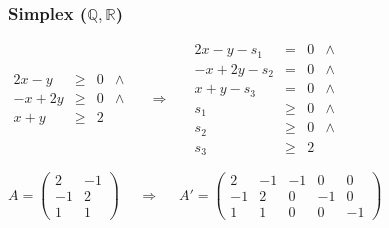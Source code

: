 \documentclass{beamer}
\begin{document}
\begin{frame}
  \frametitle{Simplex ($\mathbb{Q,R}$)}
  $\begin{array}{lclc} 2 x - y & \geq & 0 & \land \\ - x + 2 y & \geq & 0  & \land \\ x + y & \geq & 2  & \end{array}$
  ~~{\Huge $\Rightarrow$}~~
  $\begin{array}{rclc}
    2 x - y - s_1 & = & 0 & \land \\
    - x + 2 y - s_2 & = & 0  & \land \\
    x + y - s_3 & = & 0  & \land \\
    s_1 & \geq & 0 & \land \\ 
    s_2 & \geq & 0 & \land \\ 
    s_3 & \geq & 2 
  \end{array}$

  \vspace{10pt}
  
  $
  A =\left(\begin{array}{cc} 2 & -1 \\ -1 & 2 \\ 1 & 1 \end{array}\right)
  $
  ~~{\Huge $\Rightarrow$}~~
  $
  A' =\left(\begin{array}{ccccc}
    2 & -1 & -1 & 0 & 0 \\ 
    -1 & 2 & 0 & -1 & 0 \\
    1 & 1 & 0 & 0 & -1
  \end{array}\right)
  $
\end{frame}
\end{document}
